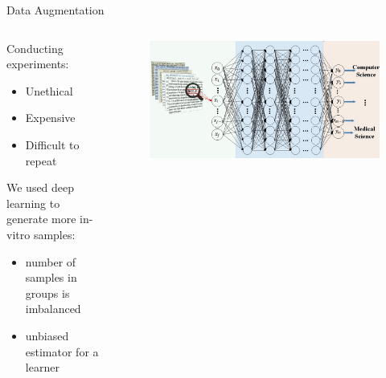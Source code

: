 \documentclass{beamer}
\begin{document}
\begin{frame}{Data Augmentation}
	\begin{columns}
		\begin{column}{.48\textwidth}
			Conducting experiments:
			\begin{itemize}
				\item Unethical
				\item Expensive
				\item Difficult to repeat
			\end{itemize}
			\vspace{1cm}
			We used deep learning to generate more in-vitro samples:
			\begin{itemize}
				\item number of samples in groups is imbalanced
				\item unbiased estimator for a learner
			\end{itemize}
		\end{column}
		\begin{column}{.48\textwidth}
			\begin{figure}[ht]
				\centering
				\includegraphics[width=1\textwidth,height=0.7\textheight]{img/deep-learning-image.jpg}
				\caption*{\label{fig:deep-learning}}
			\end{figure}
		\end{column}
	\end{columns}
\end{frame}
\end{document}

